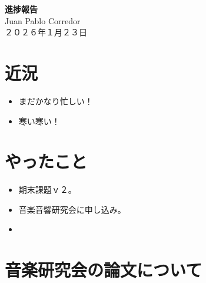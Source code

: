 \documentclass[a4paper, 11pt]{article}
\begin{document}
\begin{center}
    {\LARGE \bfseries 進捗報告} \\ %
    \vspace{0.3em} %
    Juan Pablo Corredor \\ %
    ２０２６年１月２３日 %
\end{center}
\vspace{0.5em} %

\section*{近況}
\begin{itemize}
    \item まだかなり忙しい！
    \item 寒い寒い！
\end{itemize}

\section*{やったこと}
\begin{itemize} 
    \item 期末課題ｖ２。
    \item 音楽音響研究会に申し込み。
    \item 
\end{itemize}

\section*{音楽研究会の論文について}
\end{document}
